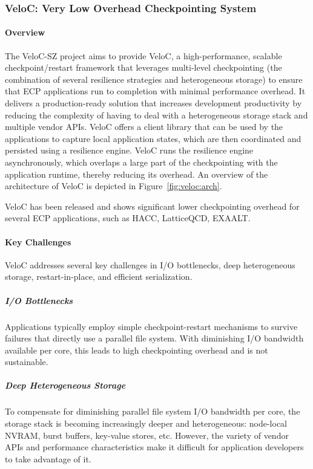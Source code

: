 \subsubsection{ VeloC: Very Low Overhead Checkpointing System}


\paragraph{Overview}
The VeloC-SZ project aims to provide VeloC, a high-performance,
scalable checkpoint/restart framework that leverages multi-level
checkpointing (the combination of several resilience strategies and
heterogeneous storage) to ensure that ECP applications run to
completion with minimal performance overhead. It delivers a
production-ready solution that increases development productivity by
reducing the complexity of having to deal with a heterogeneous storage
stack and multiple vendor APIs. VeloC offers a client library that can
be used by the applications to capture local application states, which
are then coordinated and persisted using a resilience engine.  VeloC
runs the resilience engine asynchronously, which overlaps a large part
of the checkpointing with the application runtime, thereby reducing
its overhead. An overview of the architecture of VeloC is depicted
in Figure~\ref{fig:veloc:arch}.

VeloC has been released and shows significant lower checkpointing
overhead for several ECP applications, such as HACC, LatticeQCD,
EXAALT.

\paragraph{Key Challenges}
VeloC addresses several key challenges in I/O bottlenecks, deep heterogeneous storage, restart-in-place, and efficient serialization.

\subparagraph{I/O Bottlenecks} Applications typically employ
simple checkpoint-restart mechanisms to survive failures that directly
use a parallel file system. With diminishing I/O bandwidth available
per core, this leads to high checkpointing overhead and is not
sustainable.

\subparagraph{Deep Heterogeneous Storage} To compensate for
diminishing parallel file system I/O bandwidth per core, the storage
stack is becoming increasingly deeper and heterogeneous: node-local
NVRAM, burst buffers, key-value stores, etc. However, the variety of
vendor APIs and performance characteristics make it difficult for
application developers to take advantage of it.

